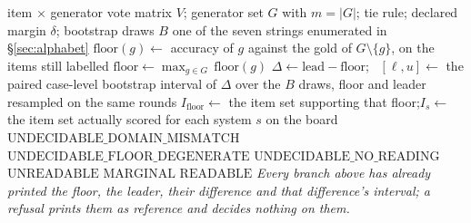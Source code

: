 \documentclass{article}
\newcommand{\ids}[1]{\texttt{\small #1}} %
\begin{document}
\begin{algorithm}[t]
\caption{The leave-one-out ruler as implemented in \ids{audit.py}, read off the decision chain in that file. The branch order is the order in the code, and that order is load-bearing: the domain gate runs before the degeneracy gate, so a corpus that fails both is reported as a domain mismatch. The three gates above the comparison with $\delta$ are refusals, and they are listed in the order the code tests them.}
\label{alg:ruler}
\begin{algorithmic}[1]
\Require item $\times$ generator vote matrix $V$; generator set $G$ with $m = |G|$; tie rule; declared margin $\delta$; bootstrap draws $B$
\Ensure one of the seven strings enumerated in \S\ref{sec:alphabet}
  \State $\mathrm{floor}(g) \gets$ accuracy of $g$ against the gold of $G \setminus \{g\}$, on the items still labelled 
\EndFor
\State $\mathrm{floor} \gets \max_{g \in G}\, \mathrm{floor}(g)$ 
\State $\Delta \gets \mathrm{lead} - \mathrm{floor}$; \ $[\ell,u] \gets$ the paired case-level bootstrap interval of $\Delta$ over the $B$ draws, floor and leader resampled on the same rounds
\State $I_{\mathrm{floor}} \gets$ the item set supporting that floor;\quad $I_s \gets$ the item set actually scored for each system $s$ on the board
  \Return $\mathrm{UNDECIDABLE\_DOMAIN\_MISMATCH}$ 
  \Return $\mathrm{UNDECIDABLE\_FLOOR\_DEGENERATE}$ 
  \Return $\mathrm{UNDECIDABLE\_NO\_READING}$ 
  \Return $\mathrm{UNREADABLE}$ 
  \Return $\mathrm{MARGINAL}$
\Else
  \State \Return $\mathrm{READABLE}$ 
\EndIf
\Statex \textit{Every branch above has already printed the floor, the leader, their difference and that difference's interval; a refusal prints them as reference and decides nothing on them.}
\end{algorithmic}
\end{algorithm}
\end{document}
